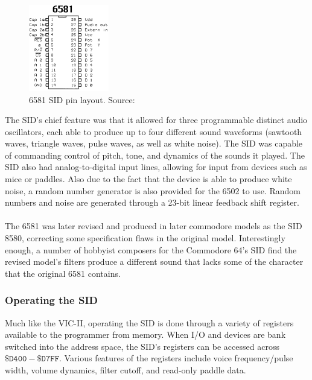 \documentclass{article}
\begin{document}
\paragraph{}
\begin{figure}
\vspace{-20pt}
\begin{center}
\includegraphics[width=3.5cm]{6581}
\caption{6581 SID pin layout. Source: \cite{c64_tech_details}}
\end{center}
\end{figure}
The SID's chief feature was that it allowed for three programmable distinct audio oscillators, each able to produce up to four different sound waveforms (sawtooth waves, triangle waves, pulse waves, as well as white noise). The SID was capable of commanding control of pitch, tone, and dynamics of the sounds it played. The SID also had analog-to-digital input lines, allowing for input from devices such as mice or paddles. Also due to the fact that the device is able to produce white noise, a random number generator is also provided for the 6502 to use. Random numbers and noise are generated through a 23-bit linear feedback shift register.

\paragraph{}
The 6581 was later revised and produced in later commodore models as the SID 8580, correcting some specification flaws in the original model. Interestingly enough, a number of hobbyist composers for the Commodore 64's SID find the revised model's filters produce a different sound that lacks some of the character that the original 6581 contains.

\subsubsection{Operating the SID}
Much like the VIC-II, operating the SID is done through a variety of registers available to the programmer from memory. When I/O and devices are bank switched into the address space, the SID's registers can be accessed across $\mathtt{\$D400 - \$D7FF}$. Various features of the registers include voice frequency/pulse width, volume dynamics, filter cutoff, and read-only paddle data.
\end{document}
